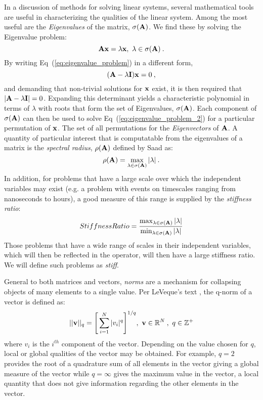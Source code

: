 In a discussion of methods for solving linear systems, several
mathematical tools are useful in characterizing the qualities of the
linear system. Among the most useful are the \textit{Eigenvalues} of
the matrix, $\sigma(\mathbf{A})$. We find these by solving the Eigenvalue
problem:
\begin{equation}
  \mathbf{A} \mathbf{x} = \lambda \mathbf{x},\ \lambda \in \sigma(\mathbf{A})\:.
  \label{eq:eigenvalue_problem}
\end{equation}
By writing Eq~(\ref{eq:eigenvalue_problem}) in a different form,
\begin{equation}
  (\mathbf{A} - \lambda \mathbf{I})\mathbf{x} = 0 \:,
  \label{eq:eigenvalue_problem_2}
\end{equation}
and demanding that non-trivial solutions for $\mathbf{x}$ exist, it is
then required that $|\mathbf{A} - \lambda \mathbf{I}| = 0$. Expanding this
determinant yields a characteristic polynomial in terms of $\lambda$
with roots that form the set of Eigenvalues, $\sigma(\mathbf{A})$. Each
component of $\sigma(\mathbf{A})$ can then be used to solve
Eq~(\ref{eq:eigenvalue_problem_2}) for a particular permutation of
$\mathbf{x}$. The set of all permutations for the \textit{Eigenvectors} of
$\mathbf{A}$. A quantity of particular interest that is computatable from
the eigenvalues of a matrix is the \textit{spectral radius},
$\rho(\mathbf{A})$ defined by Saad \citep{saad_2003} as:
\begin{equation}
  \rho(\mathbf{A}) = \max_{\lambda \in \sigma(\mathbf{A})} |\lambda| \:.
  \label{eq:spectral_radius}
\end{equation}
In addition, for problems that have a large scale over which the
independent variables may exist (e.g. a problem with events on
timescales ranging from nanoseconds to hours), a good measure of this
range is supplied by the \textit{stiffness ratio}:
\begin{equation}
  Stiffness Ratio = \frac{\max_{\lambda \in \sigma(\mathbf{A})}
    |\lambda|}{\min_{\lambda \in \sigma(\mathbf{A})} |\lambda|}
\end{equation}
Those problems that have a wide range of scales in their independent
variables, which will then be reflected in the operator, will then
have a large stiffness ratio. We will define such problems as
\textit{stiff}.

General to both matrices and vectors, \textit{norms} are a mechanism
for collapsing objects of many elements to a single value. Per
LeVeque's text \citep{leveque_2007}, the q-norm of a vector is defined
as:
\begin{equation}
  ||\mathbf{v}||_q = \Bigg[ \sum_{i=1}^N |v_i|^q \Bigg]^{1/q},\ \mathbf{v} \in
  \mathbb{R}^N\:,\ q \in \mathbb{Z}^+
  \label{eq:q_norm}
\end{equation}
where ${v_i}$ is the $i^{th}$ component of the vector. Depending on
the value chosen for $q$, local or global qualities of the vector may
be obtained. For example, $q=2$ provides the root of a quadrature sum
of all elements in the vector giving a global measure of the vector
while $q=\infty$ gives the maximum value in the vector, a local
quantity that does not give information regarding the other elements
in the vector.

